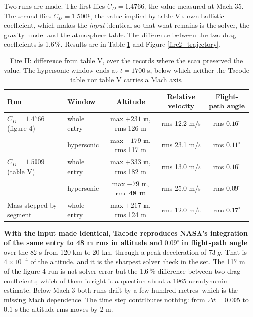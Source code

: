 \documentclass[11pt,a4paper]{article}
\begin{document}
Two runs are made. The first flies $C_D = 1.4766$, the value measured at Mach 35. The
second flies $C_D = 1.5009$, the value implied by table V's own ballistic coefficient,
which makes the \emph{input} identical so that what remains is the solver, the gravity
model and the atmosphere table. The difference between the two drag coefficients is
1.6\,\%. Results are in Table \ref{fire2_trajectory_results} and
Figure \ref{fire2_trajectory}.

\begin{table}[h]
\caption{Fire II: difference from table V, over the records where the scan preserved the
value. The hypersonic window ends at $t = 1700$ s, below which neither the Tacode table nor
table V carries a Mach axis.}
\label{fire2_trajectory_results}
\begin{center}
\footnotesize
\begin{tabular}{l|l|c|c|c}
\hline \hline
Run & Window & Altitude & Relative velocity & Flight-path angle \\
\hline
$C_D = 1.4766$ (figure 4) & whole entry & max $+231$ m, rms 126 m & rms 12.2 m/s & rms $0.16^\circ$ \\
                          & hypersonic  & max $-179$ m, rms 117 m & rms 23.1 m/s & rms $0.11^\circ$ \\
$C_D = 1.5009$ (table V)  & whole entry & max $+333$ m, rms 182 m & rms 13.0 m/s & rms $0.16^\circ$ \\
                          & hypersonic  & max $-79$ m, rms \textbf{48 m} & rms 25.0 m/s & rms \textbf{$0.09^\circ$} \\
Mass stepped by segment   & whole entry & max $+217$ m, rms 124 m & rms 12.0 m/s & rms $0.17^\circ$ \\
\hline \hline
\end{tabular}
\end{center}
\end{table}

\textbf{With the input made identical, Tacode reproduces NASA's integration of the same
entry to 48 m rms in altitude and $0.09^\circ$ in flight-path angle} over the 82 s from
120 km to 20 km, through a peak deceleration of 73 $g$. That is $4 \times 10^{-4}$ of the
altitude, and it is the sharpest solver check in the set. The 117 m of the figure-4 run is
not solver error but the 1.6\,\% difference between two drag coefficients; which of them
is right is a question about a 1965 aerodynamic estimate. Below Mach 3 both runs drift by
a few hundred metres, which is the missing Mach dependence. The time step contributes
nothing: from $\Delta t = 0.005$ to $0.1$ s the altitude rms moves by 2 m.
\end{document}

